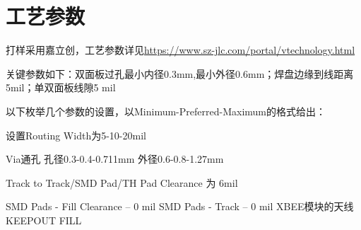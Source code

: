\section{工艺参数}

打样采用嘉立创，工艺参数详见\url{https://www.sz-jlc.com/portal/vtechnology.html}

关键参数如下：双面板过孔最小内径0.3mm,最小外径0.6mm；焊盘边缘到线距离 5mil；单双面板线隙5 mil

以下枚举几个参数的设置，以Minimum-Preferred-Maximum的格式给出：

设置Routing Width为5-10-20mil

Via通孔 孔径0.3-0.4-0.711mm 外径0.6-0.8-1.27mm

Track to Track/SMD Pad/TH Pad Clearance 为 6mil

SMD Pads - Fill Clearance -- 0 mil   SMD Pads - Track -- 0 mil     XBEE模块的天线KEEPOUT FILL